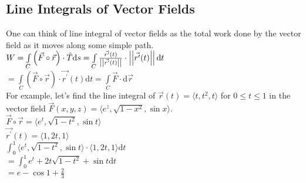 \subsection{Line Integrals of Vector Fields}
\noindent
One can think of line integral of vector fields as the total work done by the vector field as it moves along some simple path.\\
\indent
$W = \int\limits_{C}{\left(\vec{F}\circ\vec{r}\right) \cdot \hat{T}\mathrm{d}s} = \int\limits_{C}{\frac{\vec{r^\prime}(t)}{\left|\left|\vec{r^\prime}(t)\right|\right|} \cdot \left|\left|\vec{r^\prime}(t)\right|\right|\mathrm{d}t}$\\
\indent
$= \int\limits_{C}{\left(\vec{F}\circ\vec{r}\right) \cdot \vec{r^\prime}(t)\mathrm{d}t} = \int\limits_{C}{\vec{F} \cdot \mathrm{d}\vec{r}}$\\

\noindent
For example, let's find the line integral of $\vec{r}(t) = \langle t, t^2, t \rangle$ for $0 \leq t \leq 1$ in the vector field $\vec{F}(x,y,z) = \langle e^z, \sqrt{1-x^2}, \sin{x} \rangle$.\\
\indent
$\vec{F}\circ\vec{r} = \langle e^t, \sqrt{1-t^2}, \sin{t}\rangle$\\
\indent
$\vec{r^\prime}(t) = \langle 1, 2t, 1 \rangle$\\
\indent
$\int_{0}^{1}{\langle e^t, \sqrt{1-t^2}, \sin{t} \rangle \cdot \langle 1, 2t, 1 \rangle\mathrm{d}t}$\\
\indent
$= \int_{0}^{1}{e^t + 2t\sqrt{1 - t^2} + \sin{t}\mathrm{d}t}$\\
\indent
$= e - \cos{1} + \frac{2}{3}$\\



